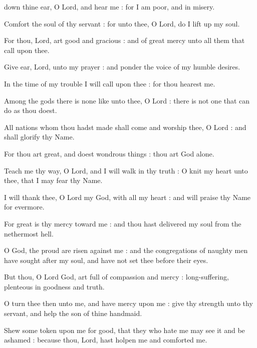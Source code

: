  down thine ear, O Lord, and hear me : for I am poor, and in misery.\par
{}
Comfort the soul of thy servant : for unto thee, O Lord, do I lift up my soul.\par
{}For thou, Lord, art good and gracious : and of great mercy unto all them that call upon thee.\par
{}Give ear, Lord, unto my prayer : and ponder the voice of my humble desires.\par
{}In the time of my trouble I will call upon thee : for thou hearest me.\par
{}Among the gods there is none like unto thee, O Lord : there is not one that can do as thou doest.\par
{}All nations whom thou hadst made shall come and worship thee, O Lord : and shall glorify thy Name.\par
{}For thou art great, and doest wondrous things : thou art God alone.\par
{}Teach me thy way, O Lord, and I will walk in thy truth : O knit my heart unto thee, that I may fear thy Name.\par
{}I will thank thee, O Lord my God, with all my heart : and will praise thy Name for evermore.\par
{}For great is thy mercy toward me : and thou hast delivered my soul from the nethermost hell.\par
{}O God, the proud are risen against me : and the congregations of naughty men have sought after my soul, and have not set thee before their eyes.\par
{}But thou, O Lord God, art full of compassion and mercy : long-suffering, plenteous in goodness and truth.\par
{}O turn thee then unto me, and have mercy upon me : give thy strength unto thy servant, and help the son of thine handmaid.\par
{}Shew some token upon me for good, that they who hate me may see it and be ashamed : because thou, Lord, hast holpen me and comforted me.\par



